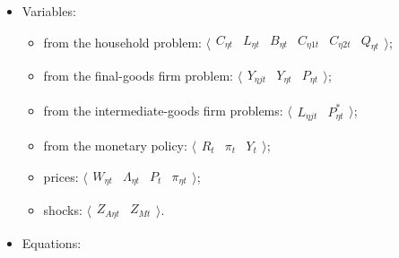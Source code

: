 \documentclass[../thesis.tex]{subfiles}
\begin{document}
{\singlespacing
	
	\begin{itemize}

		\item Variables:
		
	\begin{itemize}
	
		\item from the household problem: $\langle \begin{smallmatrix} C_{\eta t} & L_{\eta t} & B_{\eta t} & C_{\eta 1t} & C_{\eta 2t} & Q_{\eta t} \end{smallmatrix} \rangle$;
		
		\item from the final-goods firm problem: $\langle \begin{smallmatrix} Y_{\eta jt} & Y_{\eta t} & P_{\eta t} \end{smallmatrix} \rangle$;

		\item from the intermediate-goods firm problems: $\langle \begin{smallmatrix} L_{\eta jt} & P_{\eta t}^{\ast} \end{smallmatrix} \rangle$;
		
		\item from the monetary policy: $\langle \begin{smallmatrix} R_{t} & \pi_{t} & Y_{t} \end{smallmatrix} \rangle$;
		
		
		\item prices: $\langle \begin{smallmatrix} W_{\eta t} & \Lambda_{\eta t} & P_{t} & \pi_{\eta t} \end{smallmatrix} \rangle$;
		
		\item shocks: $\langle \begin{smallmatrix} Z_{A\eta t} & Z_{Mt} \end{smallmatrix} \rangle$.

	\end{itemize}

		\item Equations:
		
	\begin{enumerate}


\end{enumerate}
\end{itemize}}
\end{document}
